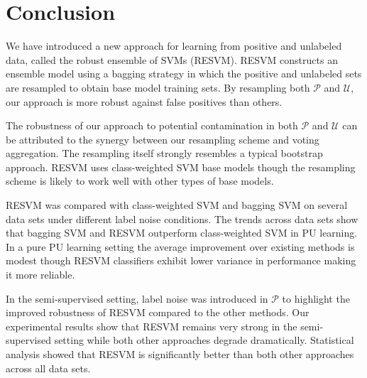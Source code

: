 \documentclass[preprint,elsarticle-num,12pt]{elsarticle}
\begin{document}

\section{Conclusion}
We have introduced a new approach for learning from positive and unlabeled data, called the robust ensemble of SVMs (RESVM). RESVM constructs an ensemble model using a bagging strategy in which the positive and unlabeled sets are resampled to obtain base model training sets. By resampling both $\mathcal{P}$ and $\mathcal{U}$, our approach is more robust against false positives than others.

The robustness of our approach to potential contamination in both $\mathcal{P}$ and $\mathcal{U}$ can be attributed to the synergy between our resampling scheme and voting aggregation. The resampling itself strongly resembles a typical bootstrap approach. RESVM uses class-weighted SVM base models though the resampling scheme is likely to work well with other types of base models.

RESVM was compared with class-weighted SVM and bagging SVM on several data sets under different label noise conditions. The trends across data sets show that bagging SVM and RESVM outperform class-weighted SVM in PU learning. In a pure PU learning setting the average improvement over existing methods is modest though RESVM classifiers exhibit lower variance in performance making it more reliable.

In the semi-supervised setting, label noise was introduced in $\mathcal{P}$ to highlight the improved robustness of RESVM compared to the other methods. Our experimental results show that RESVM remains very strong in the semi-supervised setting while both other approaches degrade dramatically. Statistical analysis showed that RESVM is significantly better than both other approaches across all data sets.

\end{document}
